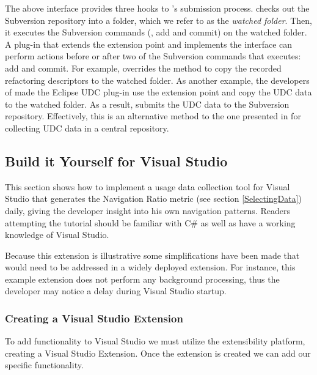 The above interface provides three hooks to \CodingSpectator's submission
process. \CodingSpectator{} checks out the Subversion repository into a folder,
which we refer to as the \emph{watched folder}. Then, it executes the Subversion
commands (\eg, add and commit) on the watched folder. A plug-in that extends the
 extension point and implements the 
interface can perform actions before or after two of the Subversion commands that
\CodingSpectator{} executes: add and commit.
%
For example, \CodingSpectator{} overrides the method  to copy
the recorded refactoring descriptors to the watched folder. As another example,
the developers of \CodingSpectator{} made the Eclipse UDC plug-in use the
 extension point and copy the UDC data to the watched folder. As
a result, \CodingSpectator{} submits the UDC data to the Subversion repository.
Effectively, this is an alternative method to the one presented in
 for collecting UDC data in a central repository.

%
%


\subsection{Build it Yourself for Visual Studio}
\label{buildItYourself}

This section shows how to implement a usage data collection tool for Visual Studio that generates the Navigation Ratio metric (see section \ref{SelectingData}) daily, giving the developer insight into his own navigation patterns. Readers attempting the tutorial should be familiar with C\# as well as have a working knowledge of Visual Studio.  

Because this extension is illustrative some simplifications have been made that would need to be addressed in a widely deployed extension. For instance, this example extension does not perform any background processing, thus the developer may notice a delay during Visual Studio startup.  

\subsubsection{Creating a Visual Studio Extension}

To add functionality to Visual Studio we must utilize the extensibility platform, creating a Visual Studio Extension. Once the extension is created we can add our specific functionality.

